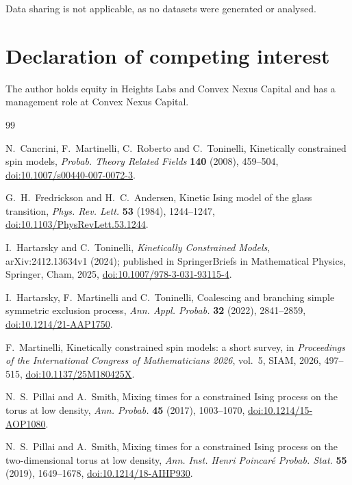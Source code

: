 \documentclass[11pt]{article}
\theoremstyle{remark}
\newcommand{\1}{\mathbf 1}
\begin{document}
Data sharing is not applicable, as no datasets were generated or analysed.

\section*{Declaration of competing interest}

The author holds equity in Heights Labs and Convex Nexus Capital and has a management role at Convex Nexus Capital.

\begin{thebibliography}{99}

N.~Cancrini, F.~Martinelli, C.~Roberto and C.~Toninelli,
Kinetically constrained spin models,
\emph{Probab. Theory Related Fields} \textbf{140} (2008), 459--504,
\href{https://doi.org/10.1007/s00440-007-0072-3}{doi:10.1007/s00440-007-0072-3}.

G.~H.~Fredrickson and H.~C.~Andersen,
Kinetic Ising model of the glass transition,
\emph{Phys. Rev. Lett.} \textbf{53} (1984), 1244--1247,
\href{https://doi.org/10.1103/PhysRevLett.53.1244}{doi:10.1103/PhysRevLett.53.1244}.

I.~Hartarsky and C.~Toninelli,
\emph{Kinetically Constrained Models},
arXiv:2412.13634v1 (2024); published in SpringerBriefs in Mathematical Physics, Springer, Cham, 2025,
\href{https://doi.org/10.1007/978-3-031-93115-4}{doi:10.1007/978-3-031-93115-4}.

I.~Hartarsky, F.~Martinelli and C.~Toninelli,
Coalescing and branching simple symmetric exclusion process,
\emph{Ann. Appl. Probab.} \textbf{32} (2022), 2841--2859,
\href{https://doi.org/10.1214/21-AAP1750}{doi:10.1214/21-AAP1750}.

F.~Martinelli,
Kinetically constrained spin models: a short survey,
in \emph{Proceedings of the International Congress of Mathematicians 2026}, vol.~5, SIAM, 2026, 497--515,
\href{https://doi.org/10.1137/25M180425X}{doi:10.1137/25M180425X}.

N.~S.~Pillai and A.~Smith,
Mixing times for a constrained Ising process on the torus at low density,
\emph{Ann. Probab.} \textbf{45} (2017), 1003--1070,
\href{https://doi.org/10.1214/15-AOP1080}{doi:10.1214/15-AOP1080}.

N.~S.~Pillai and A.~Smith,
Mixing times for a constrained Ising process on the two-dimensional torus at low density,
\emph{Ann. Inst. Henri Poincar\'e Probab. Stat.} \textbf{55} (2019), 1649--1678,
\href{https://doi.org/10.1214/18-AIHP930}{doi:10.1214/18-AIHP930}.


\end{thebibliography}
\end{document}
